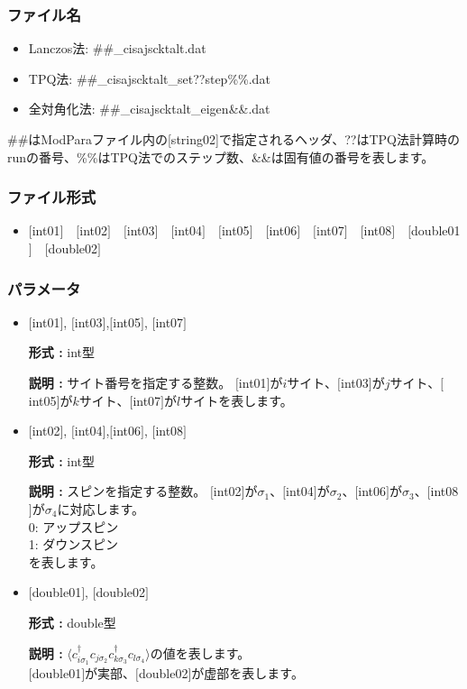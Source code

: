 \subsubsection{ファイル名}
 \begin{itemize}
   \item{Lanczos法:}  \#\#\_cisajscktalt.dat
   \item{TPQ法:} \#\#\_cisajscktalt\_set??step\%\%.dat
   \item{全対角化法:}  \#\#\_cisajscktalt\_eigen{\&\&}.dat
  \end{itemize}
  \#\#はModParaファイル内の[string02]で指定されるヘッダ、??はTPQ法計算時のrunの番号、\%\%はTPQ法でのステップ数、\&\&は固有値の番号を表します。


\subsubsection{ファイル形式}
 \begin{itemize}
   \item  $[$int01$]$~~$[$int02$]$~~$[$int03$]$~~$[$int04$]$~~$[$int05$]$~~$[$int06$]$~~$[$int07$]$~~$[$int08$]$~~$[$double01$]$~~$[$double02$]$
  \end{itemize}
\subsubsection{パラメータ}
 \begin{itemize}

  \item  $[$int01$]$, $[$int03$]$,$[$int05$]$, $[$int07$]$

 {\bf 形式 :} int型

{\bf 説明 :} サイト番号を指定する整数。
$[$int01$]$が$i$サイト、$[$int03$]$が$j$サイト、$[$int05$]$が$k$サイト、$[$int07$]$が$l$サイトを表します。
 
  \item  $[$int02$]$, $[$int04$]$,$[$int06$]$, $[$int08$]$

 {\bf 形式 :} int型 

{\bf 説明 :} スピンを指定する整数。
$[$int02$]$が$\sigma_1$、$[$int04$]$が$\sigma_2$、$[$int06$]$が$\sigma_3$、$[$int08$]$が$\sigma_4$に対応します。\\
0: アップスピン\\
1: ダウンスピン\\
を表します。

  \item  $[$double01$]$, $[$double02$]$

 {\bf 形式 :} double型 

{\bf 説明 :} $\langle c_{i\sigma_1}^{\dagger}c_{j\sigma_2}c_{k\sigma_3}^{\dagger}c_{l\sigma_4}\rangle$の値を表します。\\
$[$double01$]$が実部、$[$double02$]$が虚部を表します。\\
\end{itemize}


